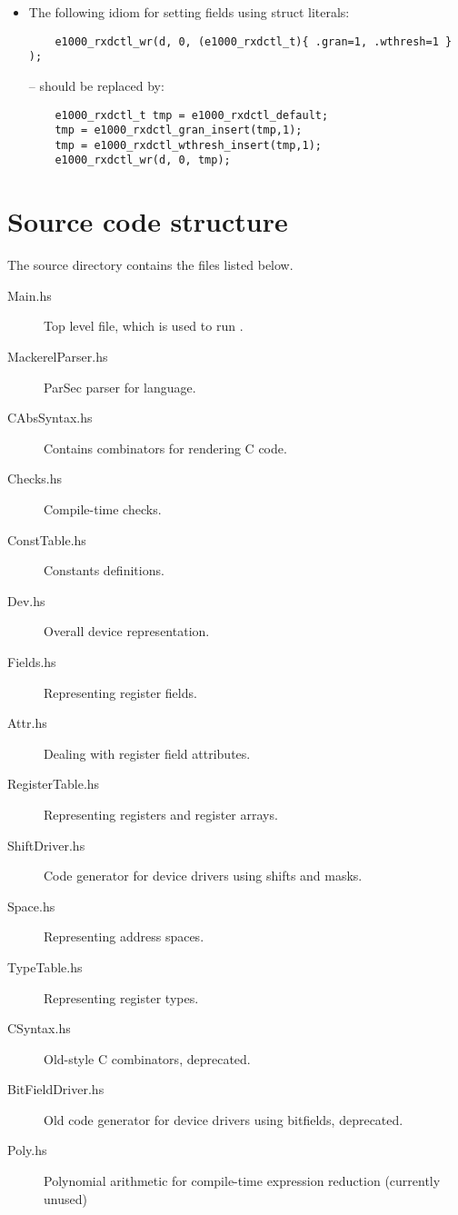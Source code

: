 \documentclass[a4paper,11pt,twoside]{report}
\begin{document}
\begin{itemize}
\item The following idiom for setting fields using struct literals:

\begin{verbatim}
    e1000_rxdctl_wr(d, 0, (e1000_rxdctl_t){ .gran=1, .wthresh=1 } );
\end{verbatim}

 -- should be replaced by:

\begin{verbatim}
    e1000_rxdctl_t tmp = e1000_rxdctl_default;
    tmp = e1000_rxdctl_gran_insert(tmp,1);
    tmp = e1000_rxdctl_wthresh_insert(tmp,1);
    e1000_rxdctl_wr(d, 0, tmp);
\end{verbatim}
\end{itemize}

\chapter{Source code structure}\label{chap:sourcetree}

The \Mac source directory contains the files listed below.

\begin{description}

\item[Main.hs] Top level file, which is used to run \Mac.
\item[MackerelParser.hs] ParSec parser for language.
\item[CAbsSyntax.hs] Contains combinators for rendering C code.
\item[Checks.hs] Compile-time checks.
\item[ConstTable.hs] Constants definitions.
\item[Dev.hs] Overall device representation.
\item[Fields.hs] Representing register fields.
\item[Attr.hs] Dealing with register field attributes.
\item[RegisterTable.hs] Representing registers and register arrays.
\item[ShiftDriver.hs] Code generator for device drivers using shifts
  and masks.
\item[Space.hs] Representing address spaces.
\item[TypeTable.hs] Representing register types.
\item[CSyntax.hs] Old-style C combinators, deprecated.
\item[BitFieldDriver.hs] Old code generator for device drivers using
  bitfields, deprecated.
\item[Poly.hs] Polynomial arithmetic for compile-time expression
  reduction (currently unused)
\end{description}
\end{document}

